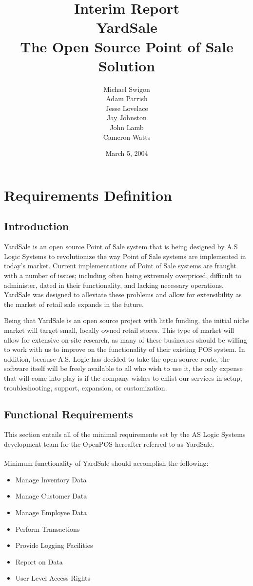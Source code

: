 \documentclass{report}
\title{{\LARGE {\bf Interim Report\\}}YardSale\\The Open Source Point of Sale Solution}
\author{Michael Swigon\\Adam Parrish\\Jesse Lovelace\\Jay Johnston\\John Lamb\\Cameron Watts}
\date{March 5, 2004}
\begin{document}
\maketitle

\tableofcontents

\chapter{Requirements Definition}

\section{Introduction}

YardSale is an open source Point of Sale system that is being
designed by A.S Logic Systems to revolutionize the way Point of
Sale systems are implemented in today's market.  Current
implementations of Point of Sale systems are fraught with a number
of issues; including often being extremely overpriced, difficult
to administer, dated in their functionality, and lacking necessary
operations.  YardSale was designed to alleviate these problems and
allow for extensibility as the market of retail sale expands in
the future.

Being that YardSale is an open source project with little funding,
the initial niche market will target small, locally owned retail
stores.  This type of market will allow for extensive on-site
research, as many of these businesses should be willing to work
with us to improve on the functionality of their existing POS
system.  In addition, because A.S. Logic has decided to take the
open source route, the software itself will be freely available to
all who wish to use it, the only expense that will come into play
is if the company wishes to enlist our services in setup,
troubleshooting, support, expansion, or customization.

\section{Functional Requirements}

This section entails all of the minimal requirements set by the AS
Logic Systems development team for the OpenPOS hereafter referred
to as YardSale.\\
\\Minimum functionality of YardSale should accomplish the
following:

\begin{itemize}
    \item {Manage Inventory Data}
    \item {Manage Customer Data}
    \item {Manage Employee Data}
    \item {Perform Transactions}
    \item {Provide Logging Facilities}
    \item {Report on Data}
    \item {User Level Access Rights}
\end{itemize}
\end{document}
